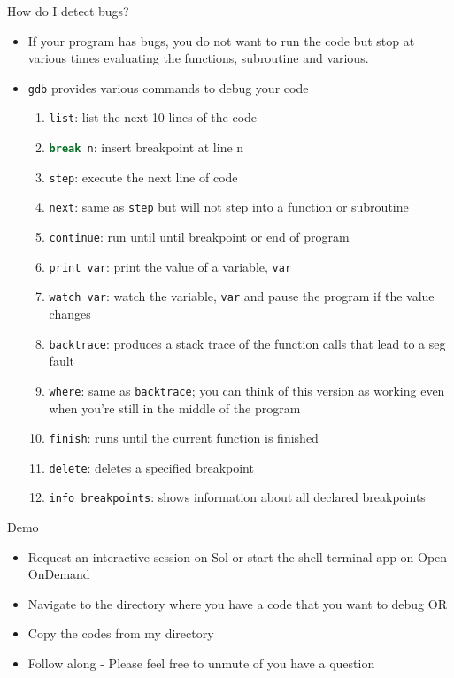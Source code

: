 \documentclass[10pt,t]{beamer}
\begin{document}
\begin{frame}[fragile]{How do I detect bugs?}
  \begin{itemize}
  \item If your program has bugs, you do not want to run the code but stop at various times evaluating the functions, subroutine and various.
  \item \lstinline|gdb| provides various commands to debug your code
    \begin{enumerate}
      \item \lstinline|list|: list the next 10 lines of the code
      \item \lstinline[language=bash]|break n|: insert breakpoint at line n
      \item \lstinline|step|: execute the next line of code
      \item \lstinline|next|: same as \lstinline|step| but will not step into a function or subroutine
      \item \lstinline|continue|: run until until breakpoint or end of program
      \item \lstinline|print var|: print the value of a variable, \lstinline|var|
      \item \lstinline|watch var|: watch the variable, \lstinline|var| and pause the program if the value changes
      \item \lstinline|backtrace|: produces a stack trace of the function calls that lead to a seg fault
      \item \lstinline|where|: same as \lstinline|backtrace|; you can think of this version as working even when you’re still in the middle of the program
      \item \lstinline|finish|: runs until the current function is finished
      \item \lstinline|delete|: deletes a specified breakpoint
      \item \lstinline|info breakpoints|: shows information about all declared breakpoints
    \end{enumerate}
  \end{itemize}
\end{frame}

\begin{frame}[fragile]{Demo}
  \begin{itemize}
  \item Request an interactive session on Sol or start the shell terminal app on Open OnDemand
  \item Navigate to the directory where you have a code that you want to debug OR
  \item Copy the codes from my directory
  \item Follow along - Please feel free to unmute of you have a question
  \end{itemize}
\end{frame}
\end{document}
